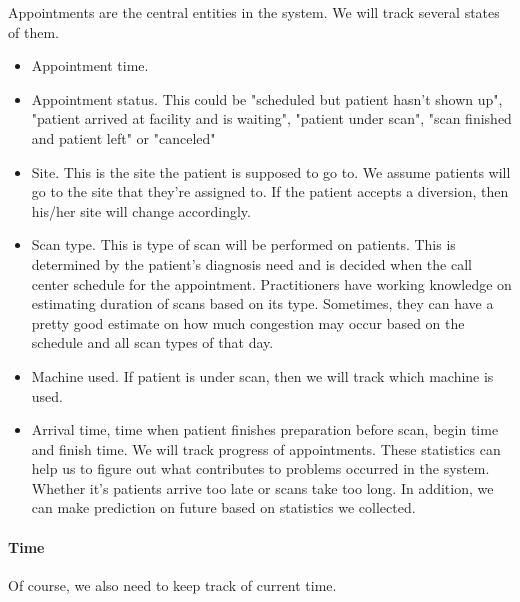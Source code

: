 Appointments are the central entities in the system. We will track several states of them.
\begin{itemize}
\item Appointment time.
\item Appointment status. This could be "scheduled but patient hasn't shown up", "patient arrived at facility and is waiting", "patient under scan", "scan finished and patient left" or "canceled"
\item Site. This is the site the patient is supposed to go to. We assume patients will go to the site that they're assigned to. If the patient accepts a diversion, then his/her site will change accordingly.
\item Scan type. This is type of scan will be performed on patients. This is determined by the patient's diagnosis need and is decided when the call center schedule for the appointment. Practitioners have working knowledge on estimating duration of scans based on its type. Sometimes, they can have a pretty good estimate on how much congestion may occur based on the schedule and all scan types of that day.
\item Machine used. If patient is under scan, then we will track which machine is used.
\item Arrival time, time when patient finishes preparation before scan, begin time and finish time. We will track progress of appointments. These statistics can help us to figure out what contributes to problems occurred in the system. Whether it's patients arrive too late or scans take too long. In addition, we can make prediction on future based on statistics we collected.
\end{itemize}

\paragraph{Time} Of course, we also need to keep track of current time.

